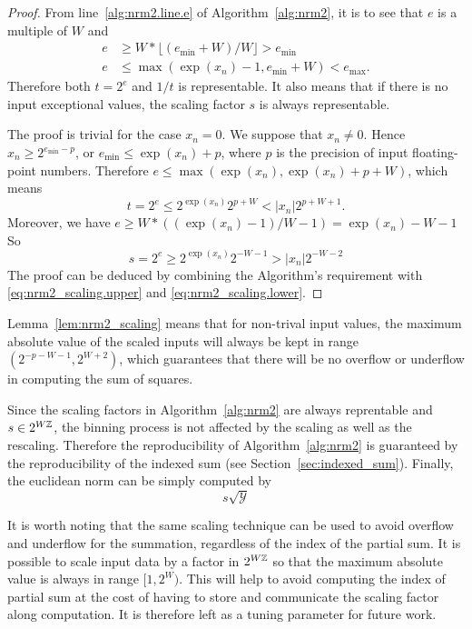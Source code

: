     \begin{proof}
         From line~\ref{alg:nrm2.line.e} of Algorithm~\ref{alg:nrm2}, it is to see that
         $e$ is a multiple of $W$ and
         \[
            \begin{aligned}
                e & \geq W * \lfloor(e_{\min} + W) / W\rfloor > e_{\min} \\
                e & \leq \max(\exp(x_n) - 1, e_{\min} + W) < e_{\max}.
            \end{aligned}
         \]
         Therefore both $t=2^e$ and $1/t$ is representable.
         It also means that if there is no input exceptional values, the scaling factor $s$ is always representable.

        The proof is trivial for the case $x_n = 0$. We suppose that $x_n \neq 0$.
        Hence $x_n \geq 2^{e_{\min} - p}$, or $e_{\min} \leq \exp(x_n) + p$,
        where $p$ is the precision of input floating-point numbers.
        Therefore $e \leq \max(\exp(x_n), \exp(x_n) + p + W)$,
        which means
        \begin{equation}
            t = 2^e \leq 2^{\exp(x_n)} 2^{p+W} < |x_n| 2^{p+W+1}.
            \label{eq:nrm2_scaling.upper}
        \end{equation}
        Moreover, we have
        \(
            e \geq W * ((\exp(x_n) -  1) / W - 1) = \exp(x_n) - W -1
        \)
        So 
        \begin{equation}
            s = 2^e \geq 2^{\exp(x_n)} 2^{- W - 1} > |x_n| 2^{-W-2}
            \label{eq:nrm2_scaling.lower}
        \end{equation}
        The proof can be deduced by combining the Algorithm's requirement
        with \eqref{eq:nrm2_scaling.upper} and \eqref{eq:nrm2_scaling.lower}.
    \end{proof}

    Lemma~\ref{lem:nrm2_scaling} means that 
    for non-trival input values, the maximum absolute value of the scaled inputs
    will always be kept in range $(2^{-p-W-1}, 2^{W+2})$, which guarantees that
    there will be no overflow or underflow in computing the sum of squares.

    Since the scaling factors in Algorithm~\ref{alg:nrm2} are always reprentable and $s \in 2^{W\mathbb{Z}}$,
    the binning process is not affected by the scaling as well as the rescaling.
    Therefore the reproducibility of Algorithm~\ref{alg:nrm2} is guaranteed
    by the reproducibility of the indexed sum (see Section~\ref{sec:indexed_sum}).
    Finally, the euclidean norm can be simply computed by
    \begin{equation}
      s \sqrt{\mathcal{Y}}
    \end{equation}

    It is worth noting that the same scaling technique can be used to avoid
    overflow and underflow for the summation, regardless of the index of the partial sum.
    It is possible to scale input data by a factor in $2^{W\mathbb{Z}}$ so that the maximum
    absolute value is always in range $[1,2^W)$.
    This will help to avoid computing the index of partial sum
    at the cost of having to store and communicate the scaling factor along computation.
    It is therefore left as a tuning parameter for future work.

